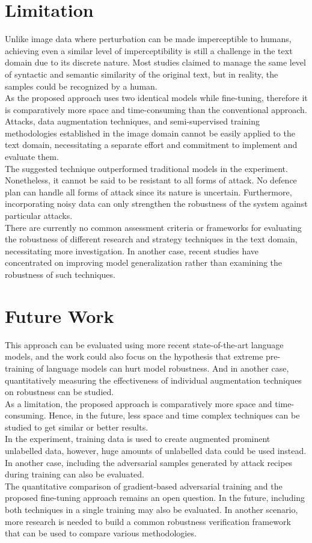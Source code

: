 \documentclass[%
	BCOR=8mm, %
	DIV=12,
	toc=bibliography, %
	toc=listof, %
	oneside, %
	egregdoesnotlikesansseriftitles, %
	]{scrbook}
\begin{document}
\section{Limitation}
\label{section:limitations}
Unlike image data where perturbation can be made imperceptible to humans, achieving even a similar level of imperceptibility is still a challenge in the text domain due to its discrete nature. Most studies claimed to manage the same level of syntactic and semantic similarity of the original text, but in reality, the samples could be recognized by a human.\\
As the proposed approach uses two identical models while fine-tuning,  therefore it is comparatively more space and time-consuming than the conventional approach. \\
Attacks, data augmentation techniques, and semi-supervised training methodologies established in the image domain cannot be easily applied to the text domain, necessitating a separate effort and commitment to implement and evaluate them.\\
The suggested technique outperformed traditional models in the experiment. Nonetheless, it cannot be said to be resistant to all forms of attack. No defence plan can handle all forms of attack since its nature is uncertain. Furthermore, incorporating noisy data can only strengthen the robustness of the system against particular attacks.\\
There are currently no common assessment criteria or frameworks for evaluating the robustness of different research and strategy techniques in the text domain, necessitating more investigation. In another case, recent studies have concentrated on improving model generalization rather than examining the robustness of such techniques.
\section{Future Work }
\label{section:futurework}
This approach can be evaluated using more recent state-of-the-art language models, and the work could also focus on the hypothesis that extreme pre-training of language models can hurt model robustness. And in another case, quantitatively measuring the effectiveness of individual augmentation techniques on robustness can be studied.\\
As a limitation, the proposed approach is comparatively more space and time-consuming. Hence, in the future, less space and time complex techniques can be studied to get similar or better results. \\
In the experiment, training data is used to create augmented prominent unlabelled data, however, huge amounts of unlabelled data could be used instead. In another case, including the adversarial samples generated by attack recipes during training can also be evaluated. \\
The quantitative comparison of gradient-based adversarial training and the proposed fine-tuning approach remains an open question. In the future, including both techniques in a single training may also be evaluated. In another scenario, more research is needed to build a common robustness verification framework that can be used to compare various methodologies.
\end{document}
